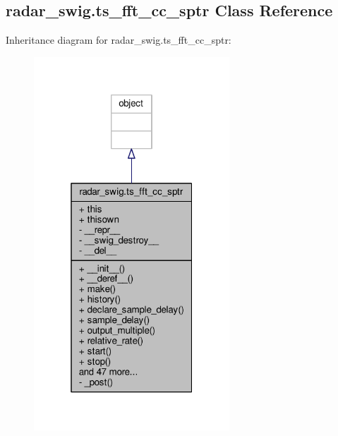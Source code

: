 \subsection{radar\+\_\+swig.\+ts\+\_\+fft\+\_\+cc\+\_\+sptr Class Reference}
\label{classradar__swig_1_1ts__fft__cc__sptr}


Inheritance diagram for radar\+\_\+swig.\+ts\+\_\+fft\+\_\+cc\+\_\+sptr\+:
\nopagebreak
\begin{figure}[H]
\begin{center}
\leavevmode
\includegraphics[width=208pt]{db/dfd/classradar__swig_1_1ts__fft__cc__sptr__inherit__graph}
\end{center}
\end{figure}


